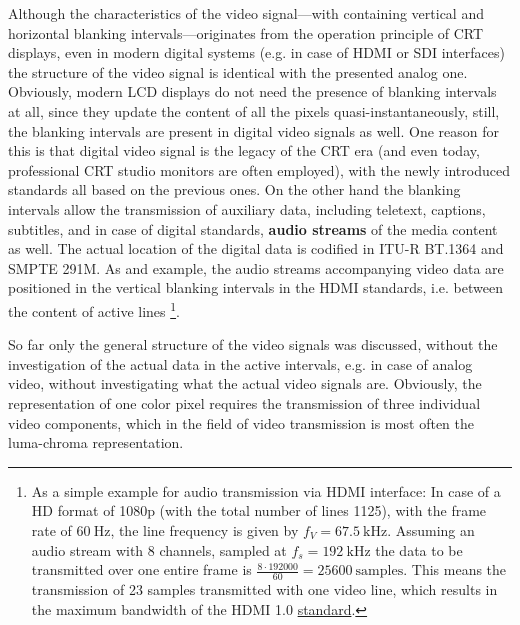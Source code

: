 Although the characteristics of the video signal---with containing vertical and horizontal blanking intervals---originates from the operation principle of CRT displays, even in modern digital systems (e.g. in case of HDMI or SDI interfaces) the structure of the video signal is identical with the presented analog one.
Obviously, modern LCD displays do not need the presence of blanking intervals at all, since they update the content of all the pixels quasi-instantaneously, still, the blanking intervals are present in digital video signals as well.
One reason for this is that digital video signal is the legacy of the CRT era (and even today, professional CRT studio monitors are often employed), with the newly introduced standards all based on the previous ones.
On the other hand the blanking intervals allow the transmission of auxiliary data, including teletext, captions, subtitles, and in case of digital standards, \textbf{audio streams} of the media content as well.
The actual location of the digital data is codified in ITU-R BT.1364 and SMPTE 291M.
As and example, the audio streams accompanying video data are positioned in the vertical blanking intervals in the HDMI standards, i.e. between the content of active lines
\footnote{
As a simple example for audio transmission via HDMI interface:
In case of a HD format of 1080p (with the total number of lines 1125), with the frame rate of $60~\mathrm{Hz}$, the line frequency is given by $f_V = 67.5~\mathrm{kHz}$.
Assuming an audio stream with 8 channels, sampled at $f_s = 192~\mathrm{kHz}$ the data to be transmitted over one entire frame is $\frac{8 \cdot 192 000 }{60} = 25600~\mathrm{samples}$.
This means the transmission of 23 samples transmitted with one video line, which results in the maximum bandwidth of the HDMI 1.0 \href{https://www.sciencedirect.com/science/article/pii/B9780128016305000049}{standard}.}.

\vspace{3mm}
So far only the general structure of the video signals was discussed, without the investigation of the actual data in the active intervals, e.g. in case of analog video, without investigating what the actual video signals are.
Obviously, the representation of one color pixel requires the transmission of three individual video components, which in the field of video transmission is most often the luma-chroma representation.


